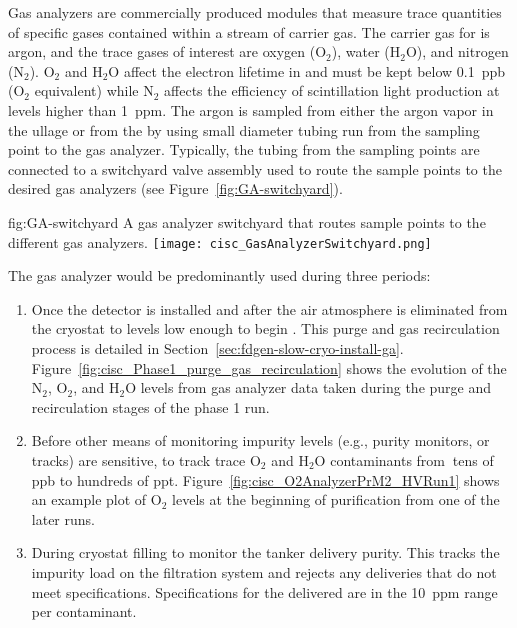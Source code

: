  Gas analyzers are commercially produced modules that measure trace quantities of specific gases contained within a stream of carrier gas. The carrier gas for  is argon, and the trace gases of interest are oxygen ($\text{O}_2$), water ($\text{H}_2\text{O}$), and nitrogen ($\text{N}_2$). $\text{O}_2$ and $\text{H}_2\text{O}$ affect the electron lifetime in  and must be kept below \SI{0.1}{ppb} ($\text{O}_2$ equivalent) while $\text{N}_2$ affects the efficiency of scintillation light production at levels higher than \SI{1}{ppm}.
The argon is sampled from either the argon vapor in the ullage or from the  by using small diameter tubing run from the sampling point to the gas analyzer. Typically, the tubing from the sampling points are connected to a switchyard valve assembly used to route the sample points to the desired gas analyzers (see Figure~\ref{fig:GA-switchyard}).


\begin{dunefigure}{fig:GA-switchyard}
  {A gas analyzer switchyard that routes sample points to the different gas analyzers.}
  \texttt{[image: cisc\_GasAnalyzerSwitchyard.png]}
\end{dunefigure}

The gas analyzer would be predominantly used during three periods:

\begin{enumerate}
\item Once the detector is installed and after the air atmosphere is eliminated from the cryostat to levels low enough to begin \cooldown. This purge and gas recirculation process is detailed in Section~\ref{sec:fdgen-slow-cryo-install-ga}. Figure~\ref{fig:cisc_Phase1_purge_gas_recirculation} shows the evolution of the $\text{N}_2$, $\text{O}_2$, and $\text{H}_2\text{O}$ levels from gas analyzer data taken during the purge and recirculation stages of the   %
phase 1 run.


\item Before other means of monitoring impurity levels (e.g., purity monitors, or  tracks) are sensitive, to track trace $\text{O}_2$ and $\text{H}_2\text{O}$ contaminants from $\>$tens of ppb to hundreds of ppt.  Figure~\ref{fig:cisc_O2AnalyzerPrM2_HVRun1} shows an example plot of $\text{O}_2$ levels at the beginning of  purification from one of the later   runs.

\item During cryostat filling to monitor the tanker  delivery purity. This tracks the impurity load on the filtration system and rejects any deliveries that do not meet specifications. %
Specifications for the delivered  are in the \SI{10}{ppm} range per contaminant.

\end{enumerate}


